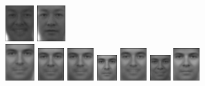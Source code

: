 \begin{figure}[hbt]
  \includegraphics[width=31pt]{../results/H_rez/correct80/1/9.jpg}
  \includegraphics[width=31pt]{../results/H_rez/correct80/1/10.jpg} \\
  \vspace{4pt}
  \includegraphics[width=0.1\textwidth]{../results/H_rez/correct80/2/testImg.jpg} \vline
  \hspace{2pt}
  \includegraphics[width=0.09\textwidth]{../results/H_rez/correct80/2/1.jpg}
  \includegraphics[width=0.09\textwidth]{../results/H_rez/correct80/2/2.jpg}
  \includegraphics[width=0.07\textwidth]{../results/H_rez/correct80/2/3.jpg}
  \includegraphics[width=0.09\textwidth]{../results/H_rez/correct80/2/4.jpg}
  \includegraphics[width=0.07\textwidth]{../results/H_rez/correct80/2/5.jpg}
  \includegraphics[width=0.09\textwidth]{../results/H_rez/correct80/2/6.jpg}

\end{figure}
